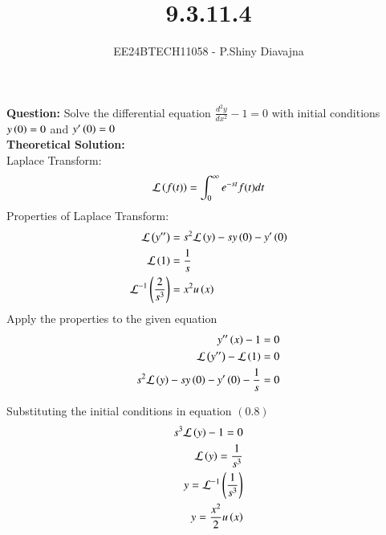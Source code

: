 \documentclass[journal]{IEEEtran}
\begin{document}

\vspace{3cm}

\title{9.3.11.4}
\author{EE24BTECH11058 - P.Shiny Diavajna}
{\let\newpage\relax\maketitle}

\renewcommand{\thefigure}{\theenumi}
\renewcommand{\thetable}{\theenumi}
\setlength{\intextsep}{10pt} %


\renewcommand{\thetable}{\theenumi}

\textbf{Question:} Solve the differential equation $\frac{d^2y}{dx^2}-1=0$ with initial conditions $y\left(0\right)=0$ and $y^{\prime}\left(0\right)=0$\\

\textbf{Theoretical Solution:}\\
Laplace Transform:
\begin{align}
    \mathcal{L}\left(f(t)\right) = \int_{0}^{\infty}e^{-st}f(t)dt
\end{align}
Properties of Laplace Transform:
\begin{align}
    \mathcal{L}\left(y^{\prime\prime}\right) &= s^2 \mathcal{L}\left(y\right) -s y\left(0\right) - y^{\prime}\left(0\right)\\
    \mathcal{L}\left(1\right)&= \frac{1}{s}\\
    \mathcal{L}^{-1}\left(\frac{2}{s^3}\right)&=x^{2} u\left(x\right)
\end{align}
Apply the properties to the given equation 
\begin{align}
     y^{\prime\prime}\left(x\right)-1=0\\
     \mathcal{L}\left(y^{\prime\prime}\right)-\mathcal{L}\left(1\right)=0\\
     s^2 \mathcal{L}\left(y\right)- sy\left(0\right) - y^{\prime}\left(0\right)-\frac{1}{s}=0
\end{align}

Substituting the initial conditions in equation $(0.8)$
\begin{align}
    s^3\mathcal{L}\left(y\right)-1=0\\
    \mathcal{L}\left(y\right)= \frac{1}{s^3}\\
    y=\mathcal{L}^{-1}\left(\frac{1}{s^3}\right)\\
    y= \frac{x^2}{2} u\left(x\right)
\end{align}
\end{document}

